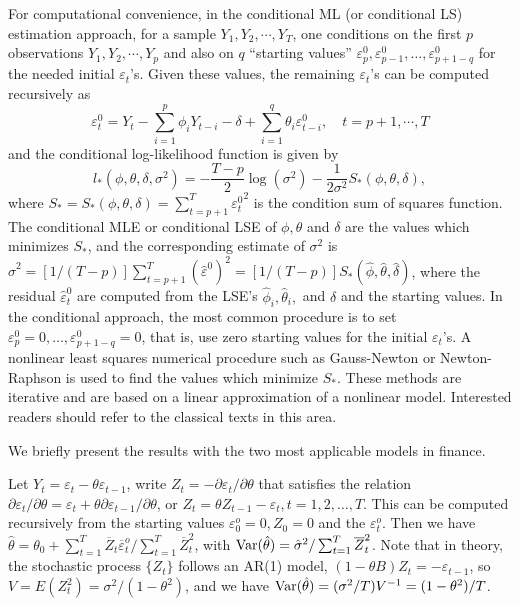 For computational convenience, in the conditional ML (or conditional LS) estimation approach, for a sample $Y_1, Y_2,\cdots,Y_T$, one conditions on the first $p$ observations $Y_1,Y_2,\cdots,Y_p$ and also on $q$ ``starting values'' $\varepsilon_p^0, \varepsilon_{p-1}^0,\ldots,\varepsilon_{p+1-q}^0$ for the needed initial $\varepsilon_t$'s. Given these values, the remaining $\varepsilon_t$'s can be computed recursively as
	\[
	\varepsilon_t^0 = Y_t - \sum_{i=1}^p\phi_iY_{t-i} - \delta + \sum_{i=1}^q\theta_i\varepsilon_{t-i}^0, \quad t= p+1,\cdots,T
	\]
and the conditional log-likelihood function is given by
	\begin{equation}\label{eqn:llowstar}
	l_*(\phi,\theta,\delta,\sigma^2) = -\frac{T - p}{2} \log(\sigma^2) - \frac{1}{2\sigma^2}S_*(\phi,\theta,\delta),
	\end{equation}
where $S_* = S_*(\phi,\theta,\delta) = \sum_{t=p+1}^T {\varepsilon_t^0}^2$ is the condition sum of squares function. The conditional MLE or conditional LSE of $\phi,\theta$ and $\delta$ are the values which minimizes $S_*$, and the corresponding estimate of $\sigma^2$ is $\hat{\sigma}^2 = [1/(T - p)]\sum_{t=p+1}^T (\hat{\varepsilon}^0)^2 = [1/(T - p)]S_*(\hat{\phi},\hat{\theta},\hat{\delta})$, where the residual $\hat{\varepsilon}_t^0$ are computed from the LSE's $\hat{\phi}_i,\hat{\theta}_i,$ and $\delta$ and the starting values. In the conditional approach, the most common procedure is to set $\varepsilon_p^0 = 0,\ldots,\varepsilon_{p+1-q}^0 = 0$, that is, use zero starting values for the initial $\varepsilon_t$'s. A nonlinear least squares numerical procedure such as Gauss-Newton or Newton-Raphson is used to find the values which minimize $S_*$. These methods are iterative and are based on a linear approximation of a nonlinear model. Interested readers should refer to the classical texts in this area.


We briefly present the results with the two most applicable models in finance.


\begin{ex}[MA(1) Model)]
Let $Y_t = \varepsilon_t - \theta\varepsilon_{t-1}$, write $Z_t = -\partial\varepsilon_t/\partial\theta$ that satisfies the relation $\partial\varepsilon_t/\partial\theta = \varepsilon_t + \theta\partial\varepsilon_{t-1}/\partial\theta$, or $Z_t = \theta Z_{t-1} - \varepsilon_t, t = 1,2,\ldots,T$. This can be computed recursively from the starting values $\varepsilon_0^o = 0, Z_0 = 0$ and the $\varepsilon_t^o$. Then we have $\hat{\theta} = \theta_0 + \sum_{t=1}^T\overline{Z}_t\overline{\varepsilon}_t^o/\sum_{t=1}^T\overline{Z}_t^2$, with $\operatorname{Var}(\hat{\theta}) = \hat{\sigma}^2/\sum_{t=1}^T\overline{Z}_t^2$. Note that in theory, the stochastic process $\{Z_t\}$ follows an AR(1) model, $(1 - \theta B)Z_t = -\varepsilon_{t-1}$, so $V = E(Z_t^2) = \sigma^2/(1 - \theta^2)$, and we have $\operatorname{Var}(\hat{\theta}) = (\sigma^2/T)V^{-1} = (1 - \theta^2)/T$.
\end{ex}


